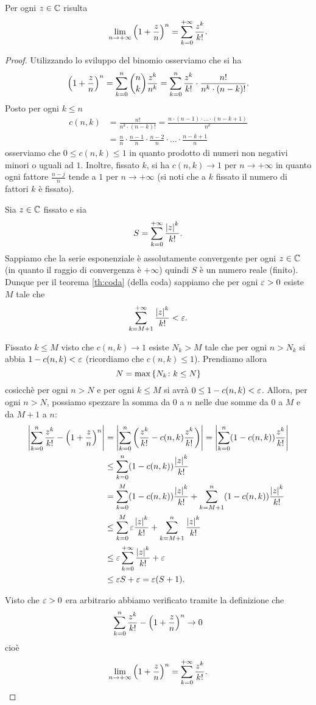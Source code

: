\begin{theorem}%
\label{th:limite_notevole_esponenziale_complesso}%
\mymark{*}%
Per ogni $z\in {\mathbb C}$ risulta
\[
  \lim_{n \to +\infty} {\left( 1+\frac z n \right)}^n  
  = \sum_{k=0}^{+\infty} \frac{z^k}{k!}.
\]
\end{theorem}
%
\begin{proof}
\mymark{*}
Utilizzando lo sviluppo del binomio osserviamo che si ha
\[
 {\left( 1+\frac z n \right)}^n
 = \sum_{k=0}^n \binom{n}{k} \frac{z^k}{n^k}
 = \sum_{k=0}^n \frac{z^k}{k!} \cdot \frac{n!}{n^k\cdot (n-k)!}.
\]
Posto per ogni $k\le n$
\begin{align*}
 c(n,k)
  &= \frac{n!}{n^k\cdot (n-k)!}
  = \frac{n \cdot (n-1) \cdot \ldots \cdot(n-k+1)}{n^k} \\
  &= \frac{n}{n}\cdot {\frac {n-1} n} \cdot \frac {n-2} {n} \cdot \ldots \cdot \frac{n-k+1}{n}
\end{align*}
osserviamo che $0\le c(n,k)\le 1$ in quanto
prodotto di numeri non negativi minori o uguali ad $1$.
Inoltre, fissato $k$, si ha $c(n,k)  \to 1$ per $n\to +\infty$
in quanto ogni fattore $\frac{n-j}{n}$ tende
a $1$ per $n\to +\infty$ (si noti che a $k$ fissato il numero di fattori $k$ è
fissato).


Sia $z\in {\mathbb C}$ fissato e sia
\[
  S = \sum_{k=0}^{+\infty} \frac{{\left|z\right|}^k}{k!}.
\]
Sappiamo che la serie esponenziale è assolutamente convergente
per ogni $z\in {\mathbb C}$ (in quanto il raggio di convergenza è $+\infty$)
quindi $S$ è un numero reale (finito).
Dunque per il teorema \ref{th:coda} (della coda) sappiamo che per ogni $\varepsilon>0$
esiste $M$ tale che
\[
   \sum_{k=M+1}^{+\infty} \frac{{\left|z\right|}^k}{k!} < \varepsilon.
\]

Fissato $k\le M$ visto che $c(n,k)\to 1$
esiste $N_k > M$ tale che per ogni $n>N_k$
si abbia $1-c(n,k) < \varepsilon$
(ricordiamo che $c(n,k)\le 1$).
Prendiamo allora
\[
  N=\max{\left\{ N_k\colon k\le N \right\}}
\]
cosicchè per ogni $n>N$ e per ogni $k\le M$ si avrà $0 \le 1-c(n,k) < \varepsilon$.
Allora, per ogni $n>N$, possiamo spezzare la somma da $0$ a $n$ nelle due
somme da $0$ a $M$ e da $M+1$ a $n$:
\begin{align*}
{\left|\sum_{k=0}^n \frac{z^k}{k!} - {\left( 1+\frac z n \right)}^n\right|}
&= {\left|\sum_{k=0}^n {\left( \frac{z^k}{k!} - c(n,k)\frac{z^k}{k!} \right)}\right|}
= {\left|\sum_{k=0}^n  (1-c(n,k))\frac{z^k}{k!}\right|} \\
&\le \sum_{k=0}^n  (1-c(n,k))\frac{{\left|z\right|}^k}{k!} \\
  &= \sum_{k=0}^{M} (1-c(n,k)) \frac{{\left|z\right|}^k}{k!}
   + \sum_{k=M+1}^n (1-c(n,k)) \frac{{\left|z\right|}^k}{k!} \\
&\le \sum_{k=0}^{M} \varepsilon \frac{{\left|z\right|}^k}{k!}
   + \sum_{k=M+1}^n \frac{{\left|z\right|}^k}{k!} \\
&\le  \varepsilon \sum_{k=0}^{+\infty} \frac{{\left|z\right|}^k}{k!}
    + \varepsilon \\
&\le \varepsilon S + \varepsilon
= \varepsilon (S+1).
\end{align*}

Visto che $\varepsilon>0$ era arbitrario abbiamo verificato
tramite la definizione che
\[
\sum_{k=0}^n \frac{z^k}{k!} - {\left( 1+\frac z n \right)}^n \to 0
\]
cioè
\[
\lim_{n\to +\infty} {\left( 1+\frac z n \right)}^n = \sum_{k=0}^{+\infty} \frac{z^k}{k!}.
\]
\end{proof}

